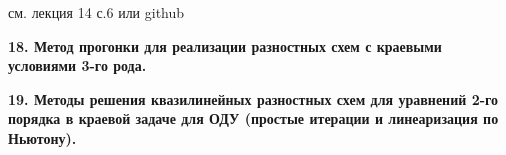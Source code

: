 \documentclass[a4paper,14pt]{article}
\begin{document}
см. лекция 14 с.6 или github

\textbf{18. Метод прогонки для реализации разностных схем с краевыми условиями 3-го рода.}

\textbf{19. Методы решения квазилинейных разностных схем для уравнений 2-го порядка в краевой задаче для ОДУ (простые итерации и линеаризация по Ньютону).}
\newpage
\begin{figure}[!h]
	\label{fig:t191}
\end{figure}
\newpage
\end{document}
